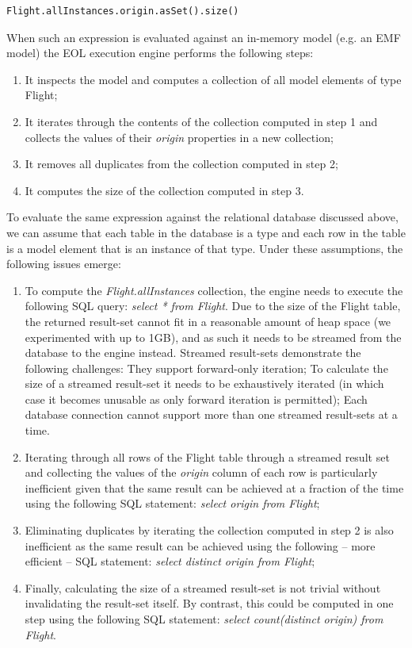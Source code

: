 \begin{lstlisting}
Flight.allInstances.origin.asSet().size()
\end{lstlisting}

When such an expression is evaluated against an in-memory model (e.g. an EMF model) the EOL execution engine performs the following steps:
\begin{enumerate}
  \item It inspects the model and computes a collection of all model elements of type Flight;
  \item It iterates through the contents of the collection computed in step 1 and collects the values of their \emph{origin} properties in a new collection;
  \item It removes all duplicates from the collection computed in step 2;
  \item It computes the size of the collection computed in step 3.
\end{enumerate}

To evaluate the same expression against the relational database discussed above, we can assume that each table in the database is a type and each row in the table is a model element that is an instance of that type. Under these assumptions, the following issues emerge:
\begin{enumerate}
  \item To compute the \emph{Flight.allInstances} collection, the engine needs to execute the following SQL query: \emph{select * from Flight}. Due to the size of the Flight table, the returned result-set cannot fit in a reasonable amount of heap space (we experimented with up to 1GB), and as such it needs to be streamed from the database to the engine instead. Streamed result-sets demonstrate the following challenges:
  \subitem They support forward-only iteration;
  \subitem To calculate the size of a streamed result-set it needs to be exhaustively iterated (in which case it becomes unusable as only forward iteration is permitted);
  \subitem Each database connection cannot support more than one streamed result-sets at a time.
  \item Iterating through all rows of the Flight table through a streamed result set and collecting the values of the \emph{origin} column of each row is particularly inefficient given that the same result can be achieved at a fraction of the time using the following SQL statement: \emph{select origin from Flight};
  \item Eliminating duplicates by iterating the collection computed in step 2 is also inefficient as the same result can be achieved using the following -- more efficient -- SQL statement: \emph{select distinct origin from Flight};
  \item Finally, calculating the size of a streamed result-set is not trivial without invalidating the result-set itself. By contrast, this could be computed in one step using the following SQL statement: \emph{select count(distinct origin) from Flight}.
\end{enumerate}

